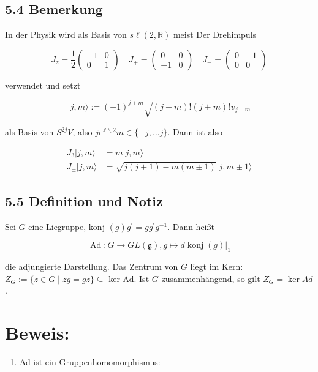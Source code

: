 \documentclass[10pt, letterpaper]{article}
\begin{document}
\subsection*{5.4 Bemerkung}
In der Physik wird als Basis von $s \ell(2, \mathbb{R})$ meist Der Drehimpuls

$$
J_{z}=\frac{1}{2}\left(\begin{array}{cc}
-1 & 0 \\
0 & 1
\end{array}\right) \quad J_{+}=\left(\begin{array}{cc}
0 & 0 \\
-1 & 0
\end{array}\right) \quad J_{-}=\left(\begin{array}{cc}
0 & -1 \\
0 & 0
\end{array}\right)
$$

verwendet und setzt

$$
|j, m\rangle:=(-1)^{j+m} \sqrt{(j-m)!(j+m)!} v_{j+m}
$$

als Basis von $S^{2 j} V$, also $j e^{\mathbb{Z} \backslash 2} m \in\{-j, \ldots j\}$. Dann ist also

$$
\begin{aligned}
J_{3}|j, m\rangle & =m|j, m\rangle \\
J_{ \pm}|j, m\rangle & =\sqrt{j(j+1)-m(m \pm 1)}|j, m \pm 1\rangle
\end{aligned}
$$

\subsection*{5.5 Definition und Notiz}
Sei $G$ eine Liegruppe, konj $(g) g^{\prime}=g g^{\prime} g^{-1}$. Dann heißt

$$
\operatorname{Ad}: G \rightarrow G L(\mathfrak{g}),\left.g \mapsto d \operatorname{konj}(g)\right|_{1}
$$

die adjungierte Darstellung. Das Zentrum von $G$ liegt im Kern:\\
$Z_{G}:=\{z \in G \mid z g=g z\} \subseteq$ ker Ad. Ist $G$ zusammenhängend, so gilt $Z_{G}=\operatorname{ker} A d$.

\section*{Beweis:}
\begin{enumerate}
  \item Ad ist ein Gruppenhomomorphismus:
\end{enumerate}
\end{document}
